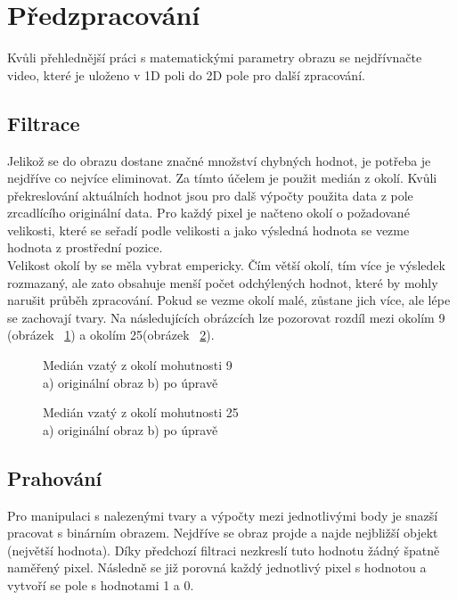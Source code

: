 \section{Předzpracování}

Kvůli přehlednější práci s matematickými parametry obrazu se nejdřívnačte video, které je uloženo v 1D poli do 2D pole pro další zpracování.\\

\subsection{Filtrace}
Jelikož se do obrazu dostane značné množství chybných hodnot, je potřeba je nejdříve co nejvíce eliminovat. Za tímto účelem je použit medián z okolí. Kvůli překreslování aktuálních hodnot jsou pro dalš výpočty použita data z pole zrcadlícího originální data. Pro každý pixel je načteno okolí o požadované velikosti, které se seřadí podle velikosti a jako výsledná hodnota se vezme hodnota z prostřední pozice.\\

Velikost okolí by se měla vybrat empericky. Čím větší okolí, tím více je výsledek rozmazaný, ale zato obsahuje menší počet odchýlených hodnot, které by mohly narušit průběh zpracování. Pokud se vezme okolí malé, zůstane jich více, ale lépe se zachovají tvary. Na následujících obrázcích lze pozorovat rozdíl mezi okolím 9 (obrázek ~\ref{pic10}) a okolím 25(obrázek ~\ref{pic11}).\\

\begin{figure}[htp]
\centering
{} \hfil
{}
\caption{Medián vzatý z okolí mohutnosti 9 \\ a) originální obraz b) po úpravě}
\label{pic10}
\end{figure}
\begin{figure}[htp]
\centering
{} \hfil
{}
\caption{Medián vzatý z okolí mohutnosti 25 \\ a) originální obraz b) po úpravě}
\label{pic11}
\end{figure}

\subsection{Prahování}
Pro manipulaci s nalezenými tvary a výpočty mezi jednotlivými body je snazší pracovat s binárním obrazem. Nejdříve se obraz projde a najde nejbližší objekt (největší hodnota). Díky předchozí filtraci nezkreslí tuto hodnotu žádný špatně naměřený pixel. Následně se již porovná každý jednotlivý pixel s hodnotou a vytvoří se pole s hodnotami 1 a 0.

